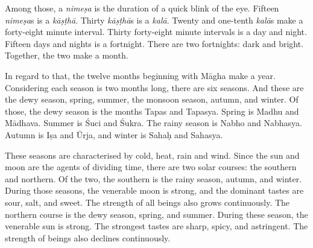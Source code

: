 \begin{translation}
	\item [4]
	Among those, %
	a \emph{nimeṣa} is the duration of a quick blink of the eye. %
	Fifteen \emph{nimeṣa}s is a \emph{kāṣṭhā}. %
	Thirty \emph{kāṣṭhā}s is a \emph{kalā}. %
	Twenty and one-tenth \emph{kalā}s make a forty-eight minute interval. %
	Thirty forty-eight minute intervals is a day and night. %
	Fifteen days and nights is a fortnight. %
	There are two fortnights: dark and bright. Together, the two make a month.


	\item [5]
	In regard to that, %
	the twelve months beginning with Māgha make a year. %
	Considering each season is two months long, there are six seasons. %
	And these are the dewy season, %
	spring, %
	summer, %
	the monsoon season, %
	autumn, %
	and winter. %
	Of those, the dewy season is the months Tapas and Tapasya. Spring is Madhu and Mādhava. Summer is Śuci and Śukra. The rainy season is Nabho and Nabhasya. Autumn is Iṣa and Ūrja, and winter is Sahaḥ and Sahasya.

	\item [6]
	These seasons are characterised by cold, heat, rain and wind. %
	Since the sun and moon are the agents of dividing time, %
	there are two solar courses: %
	the southern and northern. %
	Of the two, the southern is the rainy season, autumn, and winter. During those seasons, the venerable moon is strong, %
	and the dominant tastes are sour, salt, and sweet. %
	The strength of all beings also grows continuously. %
	The northern course is the dewy season, spring, and summer. %
	During these season, the venerable sun is strong. %
	The strongest tastes are sharp, spicy, and astringent. %
	The strength of beings also declines continuously.


\end{translation}
